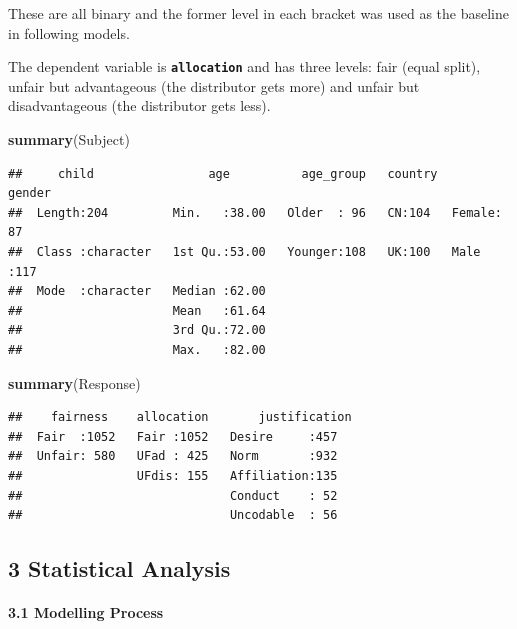 \documentclass[
]{article}
\newenvironment{Shaded}{\begin{snugshade}}{\end{snugshade}}
\newcommand{\KeywordTok}[1]{\textcolor[rgb]{0.13,0.29,0.53}{\textbf{#1}}}
\newcommand{\NormalTok}[1]{#1}
\begin{document}
These are all binary and the former level in each bracket was used as
the baseline in following models.

The dependent variable is \textbf{\texttt{allocation}} and has three
levels: fair (equal split), unfair but advantageous (the distributor
gets more) and unfair but disadvantageous (the distributor gets less).

\begin{Shaded}
\begin{Highlighting}[]
\KeywordTok{summary}\NormalTok{(Subject)}
\end{Highlighting}
\end{Shaded}

\begin{verbatim}
##     child                age          age_group   country     gender   
##  Length:204         Min.   :38.00   Older  : 96   CN:104   Female: 87  
##  Class :character   1st Qu.:53.00   Younger:108   UK:100   Male  :117  
##  Mode  :character   Median :62.00                                      
##                     Mean   :61.64                                      
##                     3rd Qu.:72.00                                      
##                     Max.   :82.00
\end{verbatim}

\begin{Shaded}
\begin{Highlighting}[]
\KeywordTok{summary}\NormalTok{(Response)}
\end{Highlighting}
\end{Shaded}

\begin{verbatim}
##    fairness    allocation       justification
##  Fair  :1052   Fair :1052   Desire     :457  
##  Unfair: 580   UFad : 425   Norm       :932  
##                UFdis: 155   Affiliation:135  
##                             Conduct    : 52  
##                             Uncodable  : 56
\end{verbatim}

\hypertarget{statistical-analysis}{%
\subsection{3 Statistical Analysis}\label{statistical-analysis}}

\hypertarget{modelling-process}{%
\paragraph{3.1 Modelling Process}\label{modelling-process}}
\end{document}
